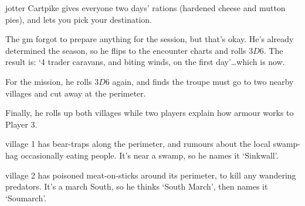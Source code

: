 \begin{multicols}{2}
{\begin{description}
    \Gls{jotter} Cartpike gives everyone two days' rations (hardened cheese and mutton pies), and lets you pick your destination.
  \end{description}

}{
  The \gls{gm} forgot to prepare anything for the session, but that's okay.
  He's already determined the season, so he flips to the encounter charts and rolls $3D6$.
  The result is: `4 trader caravans, and biting winds, on the first day'\ldots which is now.

  For the mission, he rolls $3D6$ again, and finds the troupe must go to two nearby \glspl{village} and cut away at the perimeter.

  Finally, he rolls up both \glspl{village} while two players explain how armour works to Player 3.

  \Gls{village} 1 has bear-traps along the perimeter, and rumours about the local swamp-hag occasionally eating people.
  It's near a swamp, so he names it `Sinkwall'.

  \Gls{village} 2 has poisoned meat-on-sticks around its perimeter, to kill any wandering predators.
  It's a march South, so he thinks `South March', then names it `Soumarch'.

}

\end{multicols}
